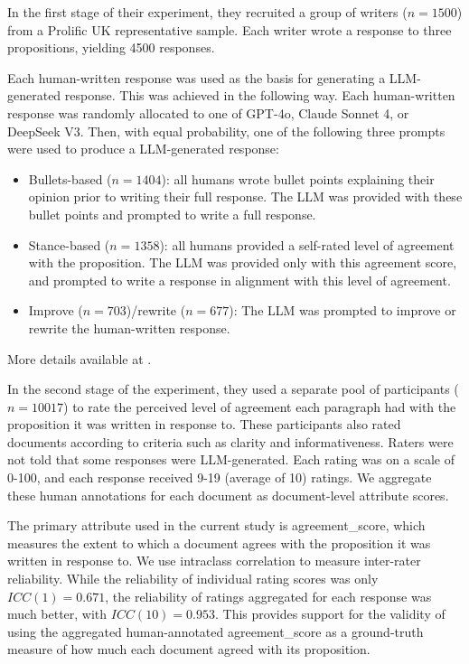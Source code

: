 In the first stage of their experiment, they recruited a group of writers ($n = 1500$) from a Prolific UK representative sample. Each writer wrote a response to three propositions, yielding 4500 responses.

Each human-written response was used as the basis for generating a LLM-generated response. This was achieved in the following way. Each human-written response was randomly allocated to one of GPT-4o, Claude Sonnet 4, or DeepSeek V3. Then, with equal probability, one of the following three prompts were used to produce a LLM-generated response:
\begin{itemize}
    \item Bullets-based ($n=1404$): all humans wrote bullet points explaining their opinion prior to writing their full response. The LLM was provided with these bullet points and prompted to write a full response.
    \item Stance-based ($n=1358$): all humans provided a self-rated level of agreement with the proposition. The LLM was provided only with this agreement score, and prompted to write a response in alignment with this level of agreement.
    \item Improve ($n=703$)/rewrite ($n=677$): The LLM was prompted to improve or rewrite the human-written response.
\end{itemize}
More details available at \citep[p.7]{rottgerQuantifyingDistortiveImpacts2025}.

In the second stage of the experiment, they used a separate pool of participants ($n=10017$) to rate the perceived level of agreement each paragraph had with the proposition it was written in response to. These participants also rated documents according to criteria such as clarity and informativeness. Raters were not told that some responses were LLM-generated. Each rating was on a scale of 0-100, and each response received 9-19 (average of 10) ratings. We aggregate these human annotations for each document as document-level attribute scores.

The primary attribute used in the current study is agreement\_score, which measures the extent to which a document agrees with the proposition it was written in response to. We use intraclass correlation to measure inter-rater reliability. While the reliability of individual rating scores was only $ICC(1) = 0.671$, the reliability of ratings aggregated for each response was much better, with $ICC(10) = 0.953$. This provides support for the validity  of using the aggregated human-annotated agreement\_score as a ground-truth measure of how much each document agreed with its proposition.

